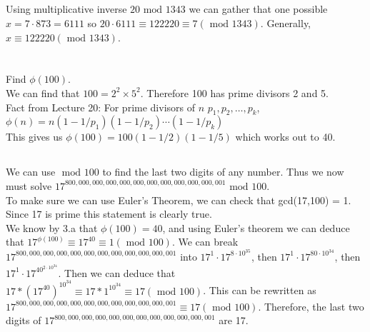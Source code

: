 \documentclass{article}
\renewcommand{\mod}{\text{ mod }}
\begin{document}
\subsection{}
Using multiplicative inverse $20 \mod 1343$ we can gather that one possible $x= 7\cdot 873 = 6111$ so $20 \cdot 6111 \equiv 122220 \equiv 7(\mod 1343)$. Generally, $x \equiv 122220 (\mod 1343)$.


\section{}
\subsection{}
Find $\phi(100)$.\\
We can find that $100 = 2^2 \times 5^2$. Therefore 100 has prime divisors 2 and 5.\\
Fact from Lecture 20: For prime divisors of $n$ $p_1,p_2,\dots,p_k$, $\phi(n) = n(1-1/p_1)(1-1/p_2)\cdots(1-1/p_k)$\\
This gives us $\phi(100) = 100(1-1/2)(1-1/5)$ which works out to 40.

\subsection{}
We can use $\mod 100$ to find the last two digits of any number. Thus we now must solve $17^{800,000,000,000,000,000,000,000,000,000,000,001} \mod 100$. \\
To make sure we can use Euler's Theorem, we can check that gcd(17,100) = 1. Since 17 is prime this statement is clearly true.\\
We know by 3.a that $\phi(100)=40$, and using Euler's theorem we can deduce that $17^{\phi(100)} \equiv 17^{40} \equiv 1 (\mod 100)$. We can break $17^{800,000,000,000,000,000,000,000,000,000,000,001}$ into 
$17^1 \cdot 17^{8 \cdot 10^{35}}$, then 
$17^1 \cdot 17^{80 \cdot 10^{34}}$, then 
$17^1 \cdot 17^{40^{2 \cdot 10^{34}}}$.
Then we can deduce that $17 * (17^{40})^{10^{34}} \equiv 17 * 1^{10^{34}} \equiv 17 (\mod 100)$. This can be rewritten as $17^{800,000,000,000,000,000,000,000,000,000,000,001} \equiv 17 (\mod 100)$. Therefore, the last two digits of $17^{800,000,000,000,000,000,000,000,000,000,000,001}$ are 17.
\end{document}
